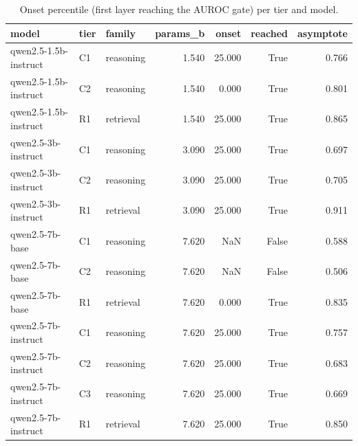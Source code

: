 \begin{table}
\caption{Onset percentile (first layer reaching the AUROC gate) per tier and model.}
\label{tab:t8_h4_depth_onsets}
\begin{tabular}{lllrrrr}
\toprule
model & tier & family & params\_b & onset & reached & asymptote \\
\midrule
qwen2.5-1.5b-instruct & C1 & reasoning & 1.540 & 25.000 & True & 0.766 \\
qwen2.5-1.5b-instruct & C2 & reasoning & 1.540 & 0.000 & True & 0.801 \\
qwen2.5-1.5b-instruct & R1 & retrieval & 1.540 & 25.000 & True & 0.865 \\
qwen2.5-3b-instruct & C1 & reasoning & 3.090 & 25.000 & True & 0.697 \\
qwen2.5-3b-instruct & C2 & reasoning & 3.090 & 25.000 & True & 0.705 \\
qwen2.5-3b-instruct & R1 & retrieval & 3.090 & 25.000 & True & 0.911 \\
qwen2.5-7b-base & C1 & reasoning & 7.620 & NaN & False & 0.588 \\
qwen2.5-7b-base & C2 & reasoning & 7.620 & NaN & False & 0.506 \\
qwen2.5-7b-base & R1 & retrieval & 7.620 & 0.000 & True & 0.835 \\
qwen2.5-7b-instruct & C1 & reasoning & 7.620 & 25.000 & True & 0.757 \\
qwen2.5-7b-instruct & C2 & reasoning & 7.620 & 25.000 & True & 0.683 \\
qwen2.5-7b-instruct & C3 & reasoning & 7.620 & 25.000 & True & 0.669 \\
qwen2.5-7b-instruct & R1 & retrieval & 7.620 & 25.000 & True & 0.850 \\
\bottomrule
\end{tabular}
\end{table}
